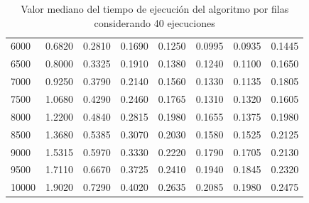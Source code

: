 \documentclass{report}
\begin{document}
\begin{appendices}
\begin{table}[H]
\begin{tabular}{lrrrrrrr}
6000             &      0.6820 &  0.2810 &  0.1690 &  0.1250 &  0.0995 &  0.0935 &  0.1445 \\
6500             &      0.8000 &  0.3325 &  0.1910 &  0.1380 &  0.1240 &  0.1100 &  0.1650 \\
7000             &      0.9250 &  0.3790 &  0.2140 &  0.1560 &  0.1330 &  0.1135 &  0.1805 \\
7500             &      1.0680 &  0.4290 &  0.2460 &  0.1765 &  0.1310 &  0.1320 &  0.1605 \\
8000             &      1.2200 &  0.4840 &  0.2815 &  0.1980 &  0.1655 &  0.1375 &  0.1980 \\
8500             &      1.3680 &  0.5385 &  0.3070 &  0.2030 &  0.1580 &  0.1525 &  0.2125 \\
9000             &      1.5315 &  0.5970 &  0.3330 &  0.2220 &  0.1790 &  0.1705 &  0.2130 \\
9500             &      1.7110 &  0.6670 &  0.3725 &  0.2410 &  0.1940 &  0.1845 &  0.2320 \\
10000            &      1.9020 &  0.7290 &  0.4020 &  0.2635 &  0.2085 &  0.1980 &  0.2475 \\
\bottomrule
\end{tabular}
\caption{Valor mediano del tiempo de ejecución del algoritmo por filas
  considerando 40 ejecuciones}
\label{table:squares-alg1-data}
\end{table}

\begin{table}[H]


\end{table}
\end{appendices}
\end{document}
